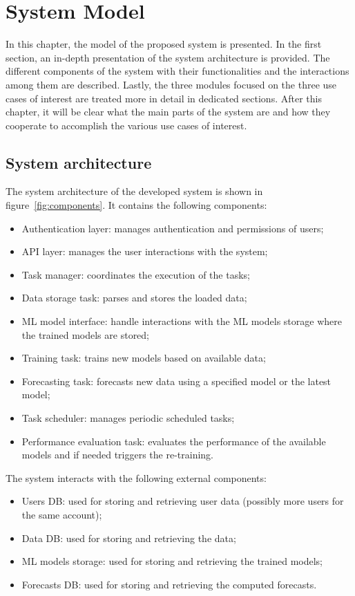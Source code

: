 \chapter{System Model}
\label{cha:system}
\vspace{0.4 cm}

In this chapter, the model of the proposed system is presented.
In the first section, an in-depth presentation of the system architecture is provided.
The different components of the system with their functionalities and the interactions among them are described.
Lastly, the three modules focused on the three use cases of interest are treated more in detail in dedicated sections.
After this chapter, it will be clear what the main parts of the system are and how they cooperate to accomplish the various use cases of interest.


\section{System architecture}
\label{sec:architecture}
\vspace{0.2 cm}

The system architecture of the developed system is shown in figure~\ref{fig:components}.
It contains the following components:
\begin{itemize}
  \item Authentication layer: manages authentication and permissions of users;
  \item API layer: manages the user interactions with the system;
  \item Task manager: coordinates the execution of the tasks;
  \item Data storage task: parses and stores the loaded data;
  \item ML model interface: handle interactions with the ML models storage where the trained models are stored;
  \item Training task: trains new models based on available data;
  \item Forecasting task: forecasts new data using a specified model or the latest model;
  \item Task scheduler: manages periodic scheduled tasks;
  \item Performance evaluation task: evaluates the performance of the available models and if needed triggers the re-training.
\end{itemize}

The system interacts with the following external components:
\begin{itemize}
  \item Users DB: used for storing and retrieving user data (possibly more users for the same account);
  \item Data DB: used for storing and retrieving the data;
  \item ML models storage: used for storing and retrieving the trained models;
  \item Forecasts DB: used for storing and retrieving the computed forecasts.
\end{itemize}

